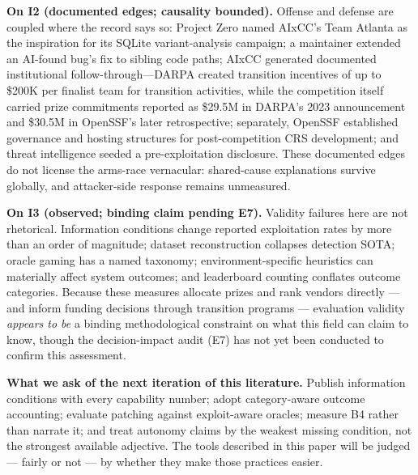 \documentclass[conference,compsoc]{IEEEtran}
\begin{document}
\textbf{On I2 (documented edges; causality bounded).} Offense and defense are coupled where the
record says so: Project Zero named AIxCC's Team Atlanta as the inspiration for its SQLite
variant-analysis campaign; a maintainer extended an AI-found bug's fix to sibling code paths;
AIxCC generated documented institutional follow-through---DARPA created transition incentives
of up to \$200K per finalist team for transition activities, while the competition itself carried prize commitments reported
as \$29.5M in DARPA's 2023 announcement and \$30.5M in OpenSSF's later retrospective; separately,
OpenSSF established governance and hosting structures for post-competition CRS development; and
threat intelligence seeded a pre-exploitation disclosure. These documented edges do not license
the arms-race vernacular: shared-cause explanations survive globally, and attacker-side
response remains unmeasured.

\textbf{On I3 (observed; binding claim pending E7).} Validity failures here are not rhetorical.
Information conditions change reported exploitation rates by more than an order of magnitude; dataset
reconstruction collapses detection SOTA; oracle gaming has a named taxonomy; environment-specific
heuristics can materially affect system outcomes; and leaderboard counting conflates outcome categories. Because
these measures allocate prizes and rank vendors directly --- and inform funding
decisions through transition programs --- evaluation validity \emph{appears to be} a binding
methodological constraint on what this field can claim to know, though the decision-impact
audit (E7) has not yet been conducted to confirm this assessment.

\textbf{What we ask of the next iteration of this literature.} Publish information conditions
with every capability number; adopt category-aware outcome accounting; evaluate patching
against exploit-aware oracles; measure B4 rather than narrate it; and treat autonomy claims by
the weakest missing condition, not the strongest available adjective. The tools described in
this paper will be judged --- fairly or not --- by whether they make those practices easier.


\balance



\appendices
\end{document}
